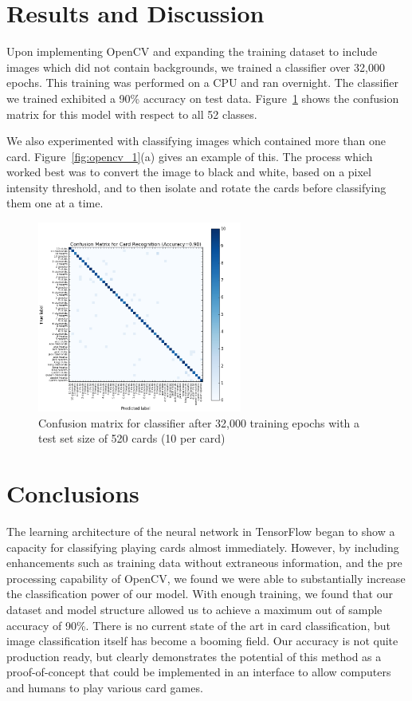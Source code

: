 \documentclass[letterpaper]{article}
\begin{document}
\section{Results and Discussion}
Upon implementing OpenCV and expanding the training dataset to include images which did not contain backgrounds, we trained a classifier over 32,000 epochs. This training was performed on a CPU and ran overnight. 
The classifier we trained exhibited a 90\% accuracy on test data. Figure~\ref{fig:confus} shows the confusion matrix for this model with respect to all 52 classes.

We also experimented with classifying images which contained more than one card. Figure~\ref{fig:opencv_1}(a) gives an example of this. The process which worked best was to convert the image to black and white, based on a pixel intensity threshold, and to then isolate and rotate the cards before classifying them one at a time.
\begin{figure}[!tbp]
\centering
\includegraphics[width=0.6\textwidth]{results/confusion.png}
\caption{\label{fig:confus}Confusion matrix for classifier after 32,000 training epochs with a test set size of 520 cards (10 per card)}
\end{figure}
\section{Conclusions}
The learning architecture of the neural network in TensorFlow began to show a capacity for classifying playing cards almost immediately. However, by including enhancements such as training data without extraneous information, and the pre processing capability of OpenCV, we found we were able to substantially increase the classification power of our model. With enough training, we found that our dataset and model structure allowed us to achieve a maximum out of sample accuracy of 90\%. There is no current state of the art in card classification, but image classification itself has become a booming field. Our accuracy is not quite production ready, but clearly demonstrates the potential of this method as a proof-of-concept that could be implemented in an interface to allow computers and humans to play various card games.

\nocite{*}


\end{document}
